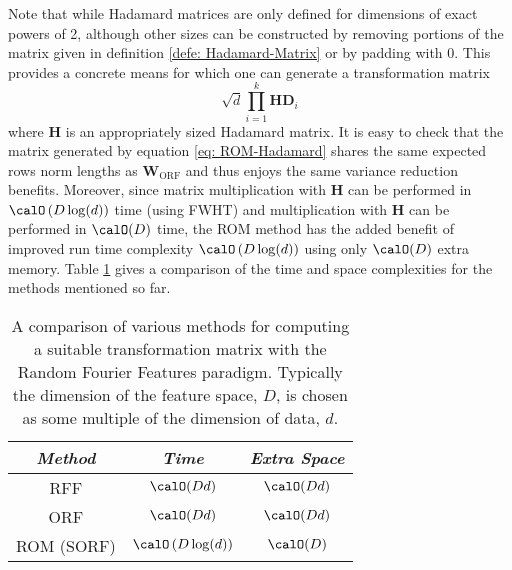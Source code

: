 Note that while Hadamard matrices are only defined for dimensions of exact powers of 2, although other sizes can be constructed by removing portions of the matrix given in definition \ref{defe: Hadamard-Matrix} or by padding with $0$. This provides a concrete means for which one can generate a transformation matrix
\begin{equation} \label{eq: ROM-Hadamard}
    \sqrt{d} \prod_{i=1}^{k} \bm{H} \bm{D}_{i}
\end{equation}
where $\bm{H}$ is an appropriately sized Hadamard matrix. It is easy to check that the matrix generated by equation \ref{eq: ROM-Hadamard} shares the same expected rows norm lengths as $\bm{W}_{\text{ORF}}$ and thus enjoys the same variance reduction benefits. Moreover, since matrix multiplication with $\bm{H}$ can be performed in $\calO \left( D \log (d) \right)$ time (using FWHT) and multiplication with $\bm{H}$ can be performed in $\calO (D)$ time, the ROM method has the added benefit of improved run time complexity $\calO \left( D \log (d) \right)$ using only $\calO (D)$ extra memory. Table \ref{table: RFF-compare} gives a comparison of the time and space complexities for the methods mentioned so far.

\begin{table}[h!]
    \centering
    \caption{A comparison of various methods for computing a suitable transformation matrix with the Random Fourier Features paradigm. Typically the dimension of the feature space, $D$, is chosen as some multiple of the dimension of data, $d$.}
    \label{table: RFF-compare}
    \begin{tabular}{*3c}                                                                                                                    \\\bottomrule
        \hline
        \emph{Method}                                                  & \emph{Time}                       & \emph{Extra Space } \\\midrule
        RFF \cite{NIPS2007_013a006f}                                   & $\calO (Dd)$                      & $\calO (Dd)$        \\
        ORF \cite{YuFelixX2016ORF}                                     & $\calO (Dd)$                      & $\calO (Dd)$        \\
        ROM (SORF) \cite{ChoromanskiKrzysztof2017TUEo,YuFelixX2016ORF} & $\calO \left( D \log (d) \right)$ & $\calO (D)$         \\\bottomrule
        \hline
    \end{tabular}
\end{table}

